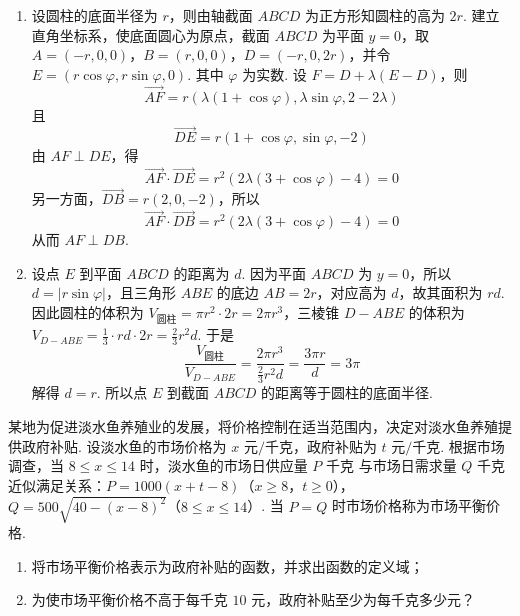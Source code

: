\begin{solution}
\begin{enumerate}
\item
设圆柱的底面半径为 \(r\)，则由轴截面 \(ABCD\) 为正方形知圆柱的高为 \(2r\). 建立直角坐标系，使底面圆心为原点，截面 \(ABCD\) 为平面 \(y=0\)，取 \(A=(-r,0,0)\)，\(B=(r,0,0)\)，\(D=(-r,0,2r)\)，并令 \(E=(r\cos\varphi,r\sin\varphi,0)\).
其中 \(\varphi\) 为实数. 设 \(F=D+\lambda(E-D)\)，则
\[
\overrightarrow{AF}=r\left(\lambda(1+\cos\varphi),\lambda\sin\varphi,2-2\lambda\right)
\]
且
\[
\overrightarrow{DE}=r(1+\cos\varphi,\sin\varphi,-2)
\]
由 \(AF\perp DE\)，得
\[
\overrightarrow{AF}\cdot\overrightarrow{DE}=r^2\left(2\lambda(3+\cos\varphi)-4\right)=0
\]
另一方面，\(\overrightarrow{DB}=r(2,0,-2)\)，所以
\[
\overrightarrow{AF}\cdot\overrightarrow{DB}=r^2\left(2\lambda(3+\cos\varphi)-4\right)=0
\]
从而 \(AF\perp DB\).

\item
设点 \(E\) 到平面 \(ABCD\) 的距离为 \(d\). 因为平面 \(ABCD\) 为 \(y=0\)，所以 \(d=|r\sin\varphi|\)，且三角形 \(ABE\) 的底边 \(AB=2r\)，对应高为 \(d\)，故其面积为 \(rd\). 因此圆柱的体积为 \(V_{\text{圆柱}}=\pi r^2\cdot2r=2\pi r^3\)，三棱锥 \(D-ABE\) 的体积为 \(V_{D-ABE}=\frac13\cdot rd\cdot2r=\frac23r^2d\).
于是
\[
\frac{V_{\text{圆柱}}}{V_{D-ABE}}=\frac{2\pi r^3}{\frac23r^2d}=\frac{3\pi r}{d}=3\pi
\]
解得 \(d=r\). 所以点 \(E\) 到截面 \(ABCD\) 的距离等于圆柱的底面半径.
\end{enumerate}
\end{solution}

\begin{problem}
某地为促进淡水鱼养殖业的发展，将价格控制在适当范围内，决定对淡水鱼养殖提供政府补贴. 设淡水鱼的市场价格为 \(x\text{ 元/千克}\)，政府补贴为 \(t\text{ 元/千克}\). 根据市场调查，当 \(8 \leqslant x \leqslant 14\) 时，淡水鱼的市场日供应量 \(P\text{ 千克}\) 与市场日需求量 \(Q\text{ 千克}\) 近似满足关系：\(P = 1000(x + t - 8)\)（\(x \geqslant 8\)，\(t \geqslant 0\)），\(Q = 500\sqrt{40 - (x - 8)^2}\)（\(8 \leqslant x \leqslant 14\)）. 当 \(P = Q\) 时市场价格称为市场平衡价格.

\begin{enumerate}
\item 将市场平衡价格表示为政府补贴的函数，并求出函数的定义域；
\item 为使市场平衡价格不高于每千克 \(10\text{ 元}\)，政府补贴至少为每千克多少元？
\end{enumerate}
\end{problem}

